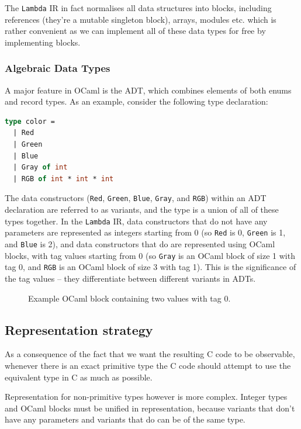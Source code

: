 \documentclass[12pt,a4paper,twoside,openright]{report}
\begin{document}
The \texttt{Lambda} IR in fact normalises all data structures into blocks, 
including references (they're a mutable singleton block), arrays, modules etc. 
which is rather convenient as we can implement all of these data types for free 
by implementing blocks.

\subsubsection{Algebraic Data Types}

A major feature in OCaml is the ADT, which combines elements of both enums and
record types. As an example, consider the following type declaration:

\begin{lstlisting}[language=Caml]
type color =
  | Red
  | Green
  | Blue
  | Gray of int
  | RGB of int * int * int
\end{lstlisting}

The data constructors (\texttt{Red}, \texttt{Green}, \texttt{Blue},
\texttt{Gray}, and \texttt{RGB}) within an ADT declaration are referred to as
variants, and the type is a union of all of these types together. In the
\texttt{Lambda} IR, data constructors that do not have any parameters are
represented as integers starting from 0 (so \texttt{Red} is 0, \texttt{Green} is
1, and \texttt{Blue} is 2), and data constructors that do are represented using
OCaml blocks, with tag values starting from 0 (so \texttt{Gray} is an OCaml
block of size 1 with tag 0, and \texttt{RGB} is an OCaml block of size 3 with
tag 1). This is the significance of the tag values -- they differentiate
between different variants in ADTs.

\begin{figure}
    \centering
    
    \caption{Example OCaml block containing two values with tag 0.}
    \label{fig:block-header}
\end{figure}

\subsection{Representation strategy}

As a consequence of the fact that we want the resulting C code to be observable,
whenever there is an exact primitive type the C code should attempt to use the
equivalent type in C as much as possible.

Representation for non-primitive types however is more complex. Integer types
and OCaml blocks must be unified in representation, because variants that don't
have any parameters and variants that do can be of the same type.
\end{document}
